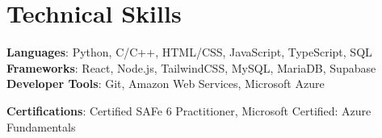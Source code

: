 \documentclass[letterpaper,11pt]{article}
\begin{document}
\section{Technical Skills}
 \begin{itemize}[leftmargin=0.15in, label={}]
    \small{\item{
     \textbf{Languages}{: Python, C/C++, HTML/CSS, JavaScript, TypeScript, SQL} \\
    \textbf{Frameworks}{: React, Node.js, TailwindCSS, MySQL, MariaDB, Supabase} \\
     \textbf{Developer Tools}{: Git, Amazon Web Services, Microsoft Azure} \\
     \begin{comment} 
    \textbf{Offensive/Defensive Security Tools}{: Metasploit, Burp Suite, Nmap, Wireshark, Ghidra, GDB+GEF, Radare2} \\
    \end{comment}  
    \textbf{Certifications}{: Certified SAFe 6 Practitioner, Microsoft Certified: Azure Fundamentals} \\
    }}
 \end{itemize}
 \vspace{-16pt}

%
\end{document}
